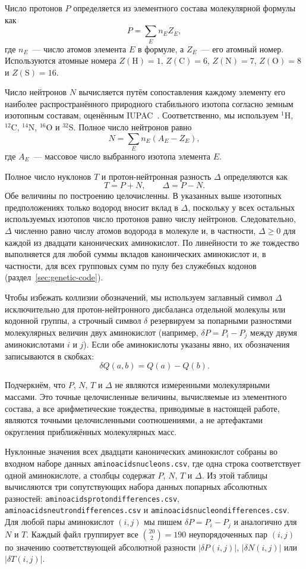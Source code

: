\documentclass[11pt,a4paper]{article}
\renewcommand{\_}{\origunderscore\allowbreak}
\begin{document}
Число протонов $P$ определяется из элементного состава молекулярной
формулы как
\[
P = \sum_E n_E Z_E,
\]
где $n_E$~--- число атомов элемента $E$ в формуле, а $Z_E$~--- его
атомный номер. Используются атомные номера
$Z(\mathrm{H}) = 1$, $Z(\mathrm{C}) = 6$, $Z(\mathrm{N}) = 7$,
$Z(\mathrm{O}) = 8$ и $Z(\mathrm{S}) = 16$.

Число нейтронов $N$ вычисляется путём сопоставления каждому элементу
его наиболее распространённого природного стабильного изотопа согласно
земным изотопным составам, оценённым IUPAC~\cite{berglund2011}.
Соответственно, мы используем $^{1}\mathrm{H}$,
$^{12}\mathrm{C}$, $^{14}\mathrm{N}$, $^{16}\mathrm{O}$ и
$^{32}\mathrm{S}$. Полное число нейтронов равно
\[
N = \sum_E n_E (A_E - Z_E),
\]
где $A_E$~--- массовое число выбранного изотопа элемента $E$.

Полное число нуклонов $T$ и протон-нейтронная разность $\Delta$
определяются как
\[
T = P + N, \qquad \Delta = P - N.
\]
Обе величины по построению целочисленны. В указанных выше изотопных
предположениях только водород вносит вклад в $\Delta$, поскольку у
всех остальных используемых изотопов число протонов равно числу
нейтронов. Следовательно, $\Delta$ численно равно числу атомов водорода в
молекуле и, в частности, $\Delta \geq 0$ для каждой из двадцати
канонических аминокислот. По линейности то же тождество выполняется
для любой суммы вкладов канонических аминокислот и, в частности, для
всех групповых сумм по пулу без служебных кодонов
(раздел~\ref{sec:genetic-code}).

Чтобы избежать коллизии обозначений, мы используем заглавный символ
$\Delta$ исключительно для протон-нейтронного дисбаланса отдельной
молекулы или кодонной группы, а строчный символ $\delta$ резервируем
за попарными разностями молекулярных величин двух аминокислот (например,
$\delta P = P_i - P_j$ между двумя аминокислотами $i$ и $j$).
Если обе аминокислоты указаны явно, их обозначения записываются в
скобках:
\[
\delta Q(a,b)=Q(a)-Q(b).
\]

Подчеркнём, что $P$, $N$, $T$ и $\Delta$ не являются измеренными
молекулярными массами. Это точные целочисленные величины, вычисляемые
из элементного состава, а все арифметические тождества, приводимые в
настоящей работе, являются точными целочисленными соотношениями, а не
артефактами округления приближённых молекулярных масс.

Нуклонные значения всех двадцати канонических аминокислот собраны во
входном наборе данных \texttt{amino\_acids\_nucleons.csv}, где одна
строка соответствует одной аминокислоте, а столбцы содержат $P$, $N$,
$T$ и $\Delta$. Из этой таблицы вычисляются три сопутствующих набора
данных попарных абсолютных разностей:
\texttt{amino\_acids\_proton\_differences.csv},
\texttt{amino\_acids\_neutron\_differences.csv} и
\texttt{amino\_acids\_nucleon\_differences.csv}. Для любой пары
аминокислот $(i, j)$ мы пишем $\delta P = P_i - P_j$ и аналогично для
$N$ и $T$. Каждый файл группирует все $\binom{20}{2} = 190$ неупорядоченных пар
$(i,j)$ по значению соответствующей абсолютной разности
$|\delta P(i,j)|$, $|\delta N(i,j)|$ или $|\delta T(i,j)|$.
\end{document}
